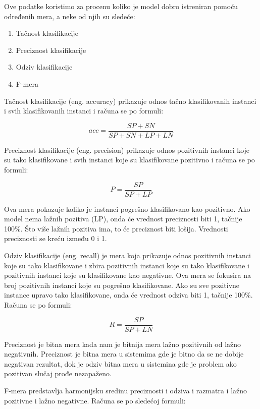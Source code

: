 \documentclass[12pt,oneside]{memoir}
\begin{document}
Ove podatke koristimo za procenu koliko je model dobro istreniran pomoću određenih mera, a neke od njih su sledeće:

\begin{enumerate}
\item Tačnost klasifikacije
\item Preciznost klasifikacije
\item Odziv klasifikacije
\item F-mera
\end{enumerate}

Tačnost klasifikacije (eng. accuracy) prikazuje odnos tačno klasifikovanih instanci i svih klasifikovanih instanci i računa se po formuli:

\begin{equation}
	acc = \frac{SP+SN}{SP+SN+LP+LN}
\end{equation}

Preciznost klasifikacije (eng. precision) prikazuje odnos pozitivnih instanci koje su tako klasifikovane i svih instanci koje su klasifikovane pozitivno i računa se po formuli:

\begin{equation}
	P = \frac{SP}{SP+LP}
\end{equation}

Ova mera pokazuje koliko je instanci pogrešno klasifikovano kao pozitivno. Ako model nema lažnih pozitiva (LP), onda će vrednost preciznosti biti 1, tačnije 100\%. Što više lažnih pozitiva ima, to će preciznost biti lošija. Vrednosti preciznosti se kreću između 0 i 1.

Odziv klasifikacije (eng. recall) je mera koja prikazuje odnos pozitivnih instanci koje su tako klasifikovane i zbira pozitivnih instanci koje su tako klasifikovane i pozitivnih instanci koje su klasifikovane kao negativne. Ova mera se fokusira na broj pozitivnih instanci koje su pogrešno klasifikovane. Ako su sve pozitivne instance upravo tako klasifikovane, onda će vrednost odziva biti 1, tačnije 100\%. Računa se po formuli:

\begin{equation}
	R = \frac{SP}{SP+LN}
\end{equation}

Preciznost je bitna mera kada nam je bitnija mera lažno pozitivnih od lažno negativnih. Preciznost je bitna mera u sistemima gde je bitno da se ne dobije negativan rezultat, dok je odziv bitna mera u sistemina gde je problem ako pozitivan slučaj prođe nezapaženo.

F-mera predstavlja harmonijsku sredinu preciznosti i odziva i razmatra i lažno pozitivne i lažno negativne. Računa se po sledećoj formuli:
\end{document}
